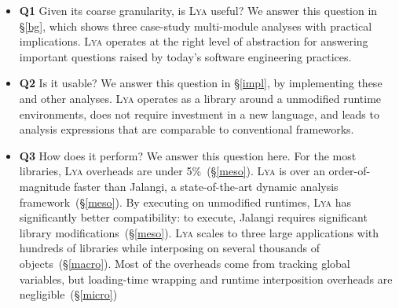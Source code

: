 \documentclass[letterpaper,twocolumn,10pt]{article}
\newcommand{\ttt}[1]{\texttt{#1}}
\newcommand{\sx}[1]{(\S\ref{#1})}
\newcommand{\sys}{{\scshape Lya}\xspace}
\begin{document}
\begin{itemize}
  \item \textbf{Q1} Given its coarse granularity, is \sys useful?
    We answer this question in \S\ref{bg}, which shows three case-study multi-module analyses with practical implications.
    \sys operates at the right level of abstraction for answering important questions raised by today's software engineering practices.

  \item \textbf{Q2} Is it usable?
     We answer this question in \S\ref{impl}, by implementing these and other analyses.
    \sys operates as a library around a unmodified runtime environments, does not require investment in a new language, and leads to analysis expressions that are comparable to conventional frameworks.

  \item \textbf{Q3} How does it perform? We answer this question here.
  For the most libraries, \sys overheads are under 5\%~\sx{meso}.
  \sys is over an order-of-magnitude faster than Jalangi, a state-of-the-art dynamic analysis framework~\sx{meso}.
  By executing on unmodified runtimes, \sys has significantly better compatibility:
    to execute, Jalangi requires significant library modifications~\sx{meso}.
  \sys scales to three large applications with hundreds of libraries while interposing on several thousands of objects~\sx{macro}.
  Most of the overheads come from tracking global variables, but loading-time wrapping and runtime interposition overheads are negligible~\sx{micro}

\end{itemize}

\end{document}
